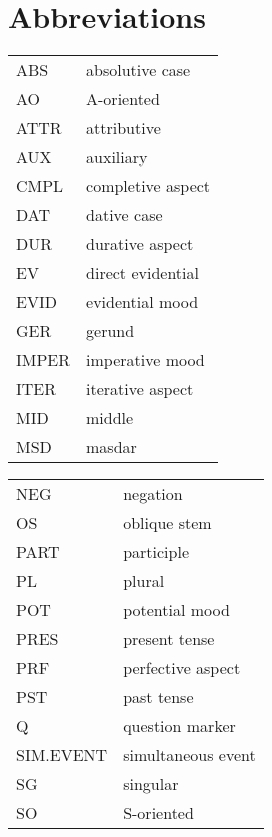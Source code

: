 \documentclass[output=paper]{langscibook}
\begin{document}
\section*{Abbreviations}
\begin{tabularx}{.45\textwidth}{lQ}
ABS & absolutive case\\
AO & A-oriented\\
ATTR & attributive\\
AUX & auxiliary\\
CMPL & completive aspect\\
DAT & dative case\\
DUR & durative aspect\\
EV & direct evidential\\
EVID & evidential mood\\
GER & gerund\\
IMPER & imperative mood\\
ITER & iterative aspect\\
MID & middle\\
MSD & masdar\\


\end{tabularx}
\begin{tabularx}{.45\textwidth}{lQ}

NEG & negation\\
OS & oblique stem\\
PART & participle\\
PL & plural\\
POT & potential mood\\
PRES & present tense\\
PRF & perfective aspect\\
PST &  past tense\\
Q & question marker\\
SIM.EVENT & simultaneous event\\
SG & singular\\
SO & S-oriented\\

\end{tabularx}


\sloppy\printbibliography[heading=subbibliography,notkeyword=this]
\end{document}
